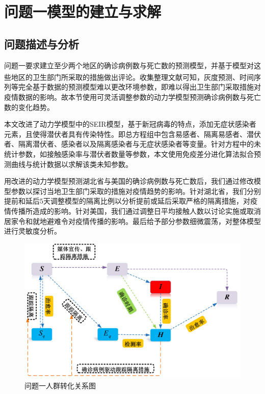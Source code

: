 \documentclass{whutmod}
\newcommand{\upcite}[1]{\textsuperscript{\cite{#1}}}
\begin{document}
	\section{问题一模型的建立与求解}
		\subsection{问题描述与分析}
			问题一要求建立至少两个地区的确诊病例数与死亡数的预测模型，并基于模型对这些地区的卫生部门所采取的措施做出评论。收集整理文献可知\upcite{2,3}，灰度预测、时间序列等完全基于数据的预测模型难以更改环境参数，即难以得出卫生部门采取措施对疫情数据的影响。故本节使用可灵活调整参数的动力学模型预测确诊病例数与死亡数的变化趋势。
			
			本文改进了动力学模型中的SEIR模型，基于新冠病毒的特点，添加无症状感染者元素，且使得潜伏者具有传染特性。即总方程组中包含易感者、隔离易感者、潜伏者、隔离潜伏者、感染者以及隔离感染者与无症状感染者等变量。针对方程中的未统计参数，如接触感染率与潜伏者数量等参数，本文使用免疫差分进化算法拟合预测曲线与统计数据以求解该类未知参数。
			
			用改进的动力学模型预测湖北省与美国的确诊病例数与死亡数后，我们通过修改模型参数以探讨当地卫生部门采取的措施对疫情趋势的影响。针对湖北省，我们分别提前和延后$5$天调整模型的隔离比例以分析提前或延后采取严格的隔离措施，对疫情传播所造成的影响。针对美国，我们通过调整日平均接触人数以讨论实施或取消居家令和就地避难令对疫情传播的影响。最后给予部分参数细微震荡，对整体模型进行灵敏度分析。
			
			\begin{figure}[H]
				\centering
				\includegraphics[width=\textwidth]{figures/kkkk.png}
				\caption{问题一人群转化关系图}\label{lct}
			\end{figure}
			
\end{document}
